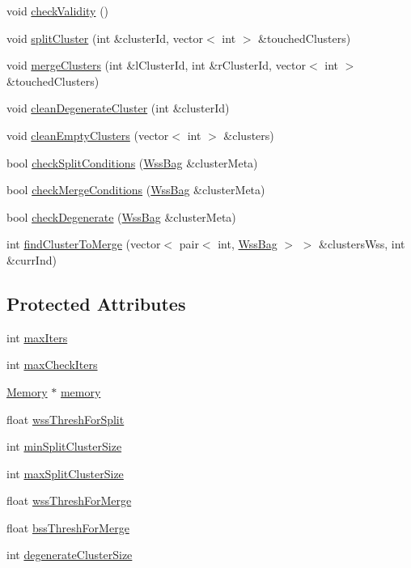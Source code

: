 \begin{DoxyCompactItemize}
\item 
void \hyperlink{class_k_means_a957725688440a070083e9fcb0f017ce9}{check\+Validity} ()
\item 
void \hyperlink{class_k_means_afd33eafb625ca716c5f808923fb7215e}{split\+Cluster} (int \&cluster\+Id, vector$<$ int $>$ \&touched\+Clusters)
\item 
void \hyperlink{class_k_means_a8e1b5e817bfd073ae331c8ebc3dfb134}{merge\+Clusters} (int \&l\+Cluster\+Id, int \&r\+Cluster\+Id, vector$<$ int $>$ \&touched\+Clusters)
\item 
void \hyperlink{class_k_means_a0004047b206790fee820d57e4b76e9c6}{clean\+Degenerate\+Cluster} (int \&cluster\+Id)
\item 
void \hyperlink{class_k_means_a127c22c2118c8ac22b84a3d2fe01dbf2}{clean\+Empty\+Clusters} (vector$<$ int $>$ \&clusters)
\item 
bool \hyperlink{class_k_means_ac934340bd9baf49360e5cf951f7f6ccb}{check\+Split\+Conditions} (\hyperlink{class_wss_bag}{Wss\+Bag} \&cluster\+Meta)
\item 
bool \hyperlink{class_k_means_a6fd3c45341b534c0ee08bb1ef57ed0d6}{check\+Merge\+Conditions} (\hyperlink{class_wss_bag}{Wss\+Bag} \&cluster\+Meta)
\item 
bool \hyperlink{class_k_means_a58eecd073218a14075ade361a7858563}{check\+Degenerate} (\hyperlink{class_wss_bag}{Wss\+Bag} \&cluster\+Meta)
\item 
int \hyperlink{class_k_means_a280557e55db230a66b5f89c284c88310}{find\+Cluster\+To\+Merge} (vector$<$ pair$<$ int, \hyperlink{class_wss_bag}{Wss\+Bag} $>$ $>$ \&clusters\+Wss, int \&curr\+Ind)
\end{DoxyCompactItemize}
\subsection*{Protected Attributes}
\begin{DoxyCompactItemize}
\item 
int \hyperlink{class_k_means_a605becae019372330541541fec4ecfe5}{max\+Iters}
\item 
int \hyperlink{class_k_means_aa0fdafa4937a817dd15c182ce0c049fe}{max\+Check\+Iters}
\item 
\hyperlink{class_memory}{Memory} $\ast$ \hyperlink{class_k_means_af11af5cfa79ac50307a580839d36deef}{memory}
\item 
float \hyperlink{class_k_means_a95c0e524c7f084ce5a1202d5d6670f45}{wss\+Thresh\+For\+Split}
\item 
int \hyperlink{class_k_means_af056c5370d89a82c2974dfc822624cf0}{min\+Split\+Cluster\+Size}
\item 
int \hyperlink{class_k_means_a99dbe7fd9c440484f54d2f0c2e7bc181}{max\+Split\+Cluster\+Size}
\item 
float \hyperlink{class_k_means_ab002dc02ca5ee154ca56b926a06338d7}{wss\+Thresh\+For\+Merge}
\item 
float \hyperlink{class_k_means_af7004e76ea22f687b4066644a37bf8c9}{bss\+Thresh\+For\+Merge}
\item 
int \hyperlink{class_k_means_a50600403065d0f967e8f2cfdcf6366e8}{degenerate\+Cluster\+Size}
\end{DoxyCompactItemize}


